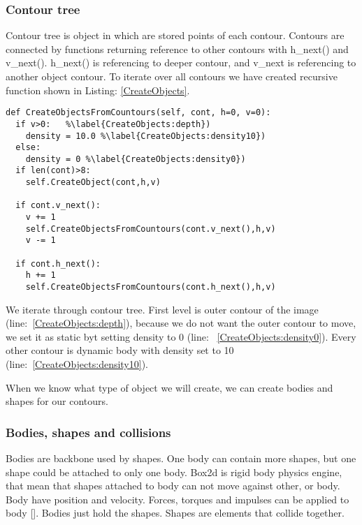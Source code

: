 \documentclass{ifacconf}
\begin{document}
\subsubsection{Contour tree}
Contour tree is object in which are stored points of each contour. Contours are
connected by functions returning reference to other contours with h\_next() and
v\_next(). h\_next() is referencing to deeper contour, and v\_next is
referencing to another object contour. To iterate over all contours we have
created recursive function shown in Listing: \ref{CreateObjects}.
\begin{lstlisting}[label=CreateObjects,caption=Function to iterate through
contour tree]
def CreateObjectsFromCountours(self, cont, h=0, v=0):
  if v>0:	%\label{CreateObjects:depth})
    density = 10.0 %\label{CreateObjects:density10})
  else:
    density = 0 %\label{CreateObjects:density0})
  if len(cont)>8:
    self.CreateObject(cont,h,v) 

  if cont.v_next():
    v += 1
    self.CreateObjectsFromCountours(cont.v_next(),h,v)
    v -= 1

  if cont.h_next():
    h += 1
    self.CreateObjectsFromCountours(cont.h_next(),h,v)
\end{lstlisting}
We iterate through contour tree. First level is outer contour of the image
(line:~\ref{CreateObjects:depth}), because we do not want the outer contour to
move, we set it as static byt setting density to 0 (line:~
\ref{CreateObjects:density0}). Every other contour is dynamic body with density
set to 10 (line:~\ref{CreateObjects:density10}).

When we know what type of object we will create, we can create bodies and
shapes for our contours.
\subsubsection{Bodies, shapes and collisions}
Bodies are backbone used by shapes. One body can contain more shapes, but one
shape could be attached to only one body. Box2d is rigid body physics engine,
that mean that shapes attached to body can not move against other, or body. Body
have position and velocity. Forces, torques and impulses can be applied to body
[\cite{Box2DManual}].  Bodies just hold the shapes. Shapes are elements that
collide together.
\end{document}
